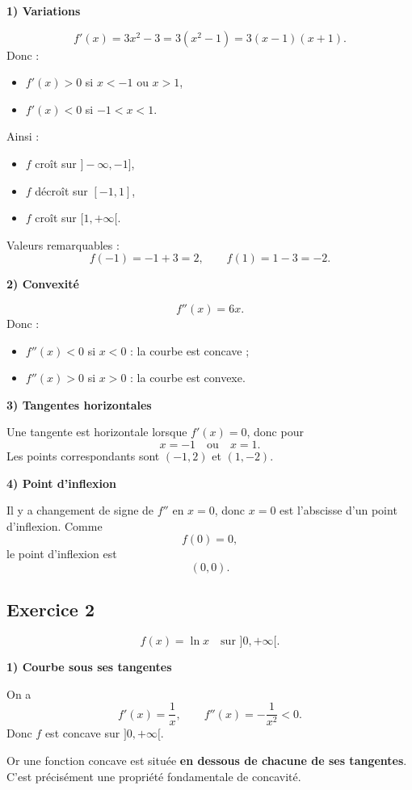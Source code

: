 \documentclass[11pt,a4paper]{article}
\begin{document}
\textbf{1) Variations}

\[
f'(x)=3x^2-3=3(x^2-1)=3(x-1)(x+1).
\]
Donc :
\begin{itemize}
    \item \(f'(x)>0\) si \(x<-1\) ou \(x>1\),
    \item \(f'(x)<0\) si \(-1<x<1\).
\end{itemize}
Ainsi :
\begin{itemize}
    \item \(f\) croît sur \(]-\infty,-1]\),
    \item \(f\) décroît sur \([-1,1]\),
    \item \(f\) croît sur \([1,+\infty[\).
\end{itemize}

Valeurs remarquables :
\[
f(-1)=-1+3=2,\qquad f(1)=1-3=-2.
\]

\textbf{2) Convexité}

\[
f''(x)=6x.
\]
Donc :
\begin{itemize}
    \item \(f''(x)<0\) si \(x<0\) : la courbe est concave ;
    \item \(f''(x)>0\) si \(x>0\) : la courbe est convexe.
\end{itemize}

\textbf{3) Tangentes horizontales}

Une tangente est horizontale lorsque \(f'(x)=0\), donc pour
\[
x=-1 \quad \text{ou} \quad x=1.
\]
Les points correspondants sont \((-1,2)\) et \((1,-2)\).

\textbf{4) Point d'inflexion}

Il y a changement de signe de \(f''\) en \(x=0\), donc \(x=0\) est l'abscisse d'un point d'inflexion.  
Comme
\[
f(0)=0,
\]
le point d'inflexion est
\[
\boxed{(0,0).}
\]

\subsection*{Exercice 2}
\[
f(x)=\ln x \quad \text{sur } ]0,+\infty[.
\]

\textbf{1) Courbe sous ses tangentes}

On a
\[
f'(x)=\frac1x,\qquad f''(x)=-\frac1{x^2}<0.
\]
Donc \(f\) est concave sur \(]0,+\infty[\).

Or une fonction concave est située \textbf{en dessous de chacune de ses tangentes}.  
C'est précisément une propriété fondamentale de concavité.
\end{document}
